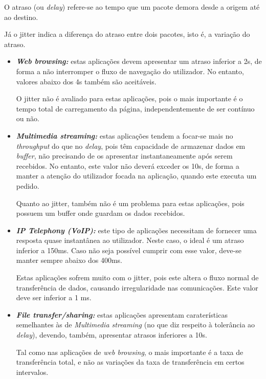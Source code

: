 \documentclass[a4paper, 11pt]{article}
\begin{document}
O atraso (ou \textit{delay}) refere-se ao tempo que um pacote demora desde a origem até ao destino.

Já o jitter indica a diferença do atraso entre dois pacotes, isto é, a variação do atraso. 

\begin{itemize}
    \item \textit{\textbf{Web browsing:}} estas aplicações devem apresentar um atraso inferior a 2s, de forma a não interromper o fluxo de navegação do utilizador. No entanto, valores abaixo dos 4s também são aceitáveis.
    
    O jitter não é avaliado para estas aplicações, pois o mais importante é o tempo total de carregamento da página, independentemente de ser contínuo ou não.
    
    \item \textit{\textbf{Multimedia streaming:}} estas aplicações tendem a focar-se mais no \textit{throughput} do que no \textit{delay}, pois têm capacidade de armazenar dados em \textit{buffer}, não precisando de os apresentar instantaneamente após serem recebidos. No entanto, este valor não deverá exceder os 10s, de forma a manter a atenção do utilizador focada na aplicação, quando este executa um pedido. 
    
    Quanto ao jitter, também não é um problema para estas aplicações, pois possuem um buffer onde guardam os dados recebidos.
    
    \item \textit{\textbf{IP Telephony (VoIP):}} este tipo de aplicações necessitam de fornecer uma resposta quase instantânea ao utilizador. Neste caso, o ideal é um atraso inferior a 150ms. Caso não seja possível cumprir com esse valor, deve-se manter sempre abaixo dos 400ms.
    
    Estas aplicações sofrem muito com o jitter, pois este altera o fluxo normal de transferência de dados, causando irregularidade nas comunicações. Este valor deve ser inferior a 1 ms.
    
    \item \textit{\textbf{File transfer/sharing:}} estas aplicações apresentam caraterísticas semelhantes às de \textit{Multimedia streaming} (no que diz respeito à tolerância ao \textit{delay}), devendo, também, apresentar atrasos inferiores a 10s.
    
    Tal como nas aplicações de \textit{web browsing}, o mais importante é a taxa de transferência total, e não as variações da taxa de transferência em certos intervalos.
    

\end{itemize}
\end{document}
